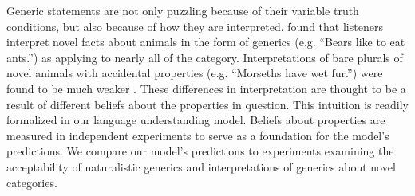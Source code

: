 \documentclass[10pt,letterpaper]{article}
\newcommand{\red}[1]{\textcolor{Red}{#1}}
\begin{document}
Generic statements are not only puzzling because of their variable truth conditions, but also because of how they are interpreted.  found that listeners  interpret novel facts about animals in the form of generics (e.g. ``Bears like to eat ants.'') as applying to nearly all of the category. Interpretations of bare plurals of novel animals with accidental properties (e.g. ``Morseths have wet fur.'') were found to be much weaker \cite{Cimpian2010}. These differences in interpretation are thought to be a result of different beliefs about the properties in question. This intuition is readily formalized in our language understanding model. Beliefs about properties are measured in independent experiments to serve as a foundation for the model's predictions. 
We compare our model's predictions to experiments examining the acceptability of naturalistic generics and interpretations of generics about novel categories.

\end{document}
